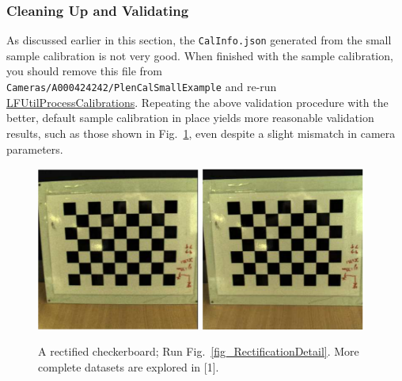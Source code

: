 \documentclass[onecolumn]{article}
\newcommand{\CiteFunc}[1]{\hyperlink{#1}{\small #1}}
\newcommand{\SymbolText}[1]{\texttt{\small #1}}
\begin{document}
\subsubsection{Cleaning Up and Validating}

As discussed earlier in this section, the \SymbolText{CalInfo.json} generated from the small sample calibration is not very good.  When finished with the sample calibration, you should remove this file from\\ \SymbolText{Cameras/A000424242/PlenCalSmallExample} and re-run \CiteFunc{LFUtilProcessCalibrations}. Repeating the above validation procedure with the better, default sample calibration in place yields more reasonable validation results, such as those shown in Fig.~\ref{fig_CalibrationExampleRectification}, even despite a slight mismatch in camera parameters.

\begin{figure}[tbh]
	\centering
	\includegraphics[width=0.48\textwidth]{Figs/SampleCalibrationRectIn}
	\includegraphics[width=0.48\textwidth]{Figs/SampleCalibrationRectOut}
	\caption{A rectified checkerboard; Run Fig.~\ref{fig_RectificationDetail}. More complete datasets are explored in [1].}
	\label{fig_CalibrationExampleRectification}
\end{figure}
\end{document}
